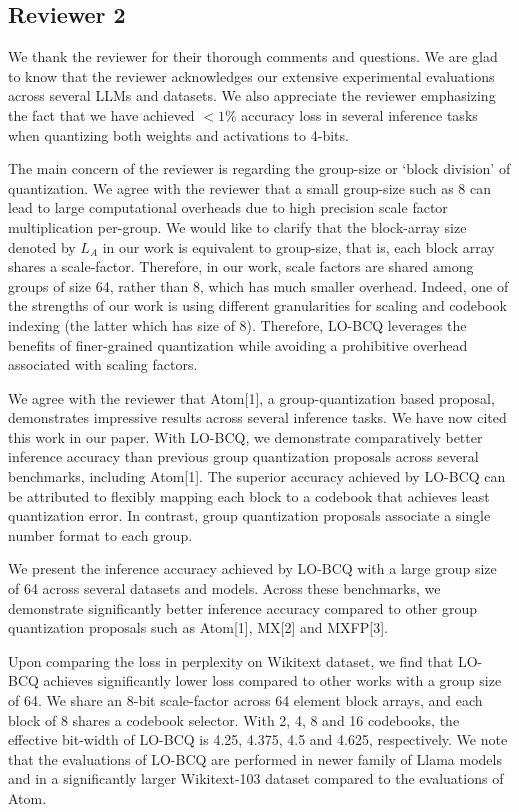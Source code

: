 \subsection{Reviewer 2}
We thank the reviewer for their thorough comments and questions. We are glad to know that the reviewer acknowledges our extensive experimental evaluations across several LLMs and datasets. We also appreciate the reviewer emphasizing the fact that we have achieved $<1$\% accuracy loss in several inference tasks when quantizing both weights and activations to 4-bits. 

The main concern of the reviewer is regarding the group-size or ‘block division’ of quantization. We agree with the reviewer that a small group-size such as 8 can lead to large computational overheads due to high precision scale factor multiplication per-group. We would like to clarify that the block-array size denoted by $L_A$ in our work is equivalent to group-size, that is, each block array shares a scale-factor. Therefore, in our work, scale factors are shared among groups of size 64, rather than 8, which has much smaller overhead. Indeed, one of the strengths of our work is using different granularities for scaling and codebook indexing (the latter which has size of 8). Therefore, LO-BCQ leverages the benefits of finer-grained quantization while avoiding a prohibitive overhead associated with scaling factors. 

 We agree with the reviewer that Atom[1], a group-quantization based proposal, demonstrates impressive results across several inference tasks. We have now cited this work in our paper. With LO-BCQ, we demonstrate comparatively better inference accuracy than previous group quantization proposals across several benchmarks, including Atom[1]. The superior accuracy achieved by LO-BCQ can be attributed to flexibly mapping each block to a codebook that achieves least quantization error. In contrast, group quantization proposals associate a single number format to each group. 

 We present the inference accuracy achieved by LO-BCQ with a large group size of 64 across several datasets and models. Across these benchmarks, we demonstrate significantly better inference accuracy compared to other group quantization proposals such as Atom[1], MX[2] and MXFP[3].

Upon comparing the loss in perplexity on Wikitext dataset, we find that LO-BCQ achieves significantly lower loss compared to other works with a group size of 64. We share an 8-bit scale-factor across 64 element block arrays, and each block of 8 shares a codebook selector. With 2, 4, 8 and 16 codebooks, the effective bit-width of LO-BCQ is 4.25, 4.375, 4.5 and 4.625, respectively. We note that the evaluations of LO-BCQ are performed in newer family of Llama models and in a significantly larger Wikitext-103 dataset compared to the evaluations of Atom. 

